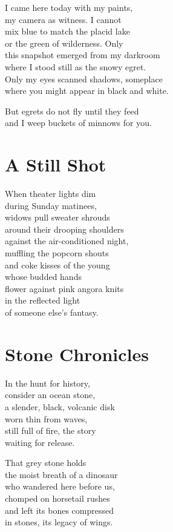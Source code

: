 \documentclass[twoside,10pt]{book}
\begin{document}
I came here today with my paints,\\
my camera as witness. I cannot\\
mix blue to match the placid lake\\
or the green of wilderness. Only\\
this snapshot emerged from my darkroom\\
where I stood still as the snowy egret.\\
Only my eyes scanned shadows, someplace\\
where you might appear in black and white.

But egrets do not fly until they feed\\
and I weep buckets of minnows for you.


\clearpage
\section{A Still Shot}

When theater lights dim\\
during Sunday matinees,\\
widows pull sweater shrouds\\
around their drooping shoulders\\
against the air-conditioned night,\\
muffling the popcorn shouts\\
and coke kisses of the young\\
whose budded hands\\
flower against pink angora knits\\
in the reflected light\\
of someone else's fantasy.


\clearpage
\section{Stone Chronicles}

In the hunt for history,\\
consider an ocean stone,\\
a slender, black, volcanic disk\\
worn thin from waves,\\
still full of fire, the story\\
waiting for release.

That grey stone holds\\
the moist breath of a dinosaur\\
who wandered here before us,\\
chomped on horsetail rushes\\
and left its bones compressed\\
in stones, its legacy of wings.
\end{document}
